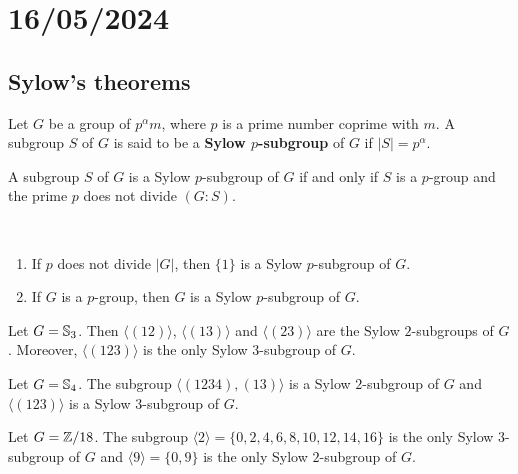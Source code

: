 \section{16/05/2024}


\subsection{Sylow's theorems}

\begin{definition}
Let $G$ be a group of $p^\alpha m$, where $p$ is a prime number
coprime with $m$. A subgroup $S$ of $G$ is said to be a \textbf{Sylow $p$-subgroup} of $G$ if $|S|=p^\alpha$.
\end{definition}

A subgroup $S$ of $G$ is a Sylow 
$p$-subgroup of $G$ if and only if $S$ is a $p$-group and
the prime $p$ does not divide $(G:S)$.

\begin{example}\
\begin{enumerate}
\item If $p$ does not divide $|G|$, then $\{1\}$ is a 
Sylow $p$-subgroup of $G$.
\item If $G$ is a $p$-group, then $G$ is a Sylow
$p$-subgroup of $G$.
\end{enumerate}
\end{example}

\begin{example}
Let $G=\mathbb{S}_3$. Then $\langle (12)\rangle$, $\langle (13)\rangle$ and $\langle (23)\rangle$ are the Sylow $2$-subgroups of $G$. Moreover, 
$\langle (123)\rangle$ is the only Sylow $3$-subgroup of $G$.
\end{example}

\begin{example}
Let $G=\mathbb{S}_4$. The subgroup $\langle (1234),(13)\rangle$ is a Sylow $2$-subgroup of $G$ and 
$\langle (123)\rangle$ is a Sylow $3$-subgroup of $G$.
\end{example}

\begin{example}
Let $G=\mathbb{Z}/18$. The subgroup 
$\langle 2\rangle =\{0,2,4,6,8,10,12,14,16\}$ is the only Sylow $3$-subgroup of $G$ and $\langle 9\rangle=\{0,9\}$ is the only
Sylow $2$-subgroup of $G$.
\end{example}

